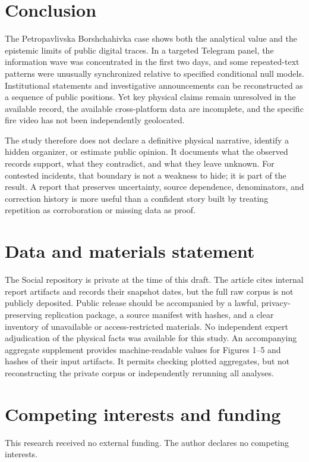 \section{Conclusion}

The Petropavlivska Borshchahivka case shows both the analytical value and the epistemic limits of public digital traces. In a targeted Telegram panel, the information wave was concentrated in the first two days, and some repeated-text patterns were unusually synchronized relative to specified conditional null models. Institutional statements and investigative announcements can be reconstructed as a sequence of public positions. Yet key physical claims remain unresolved in the available record, the available cross-platform data are incomplete, and the specific fire video has not been independently geolocated.

The study therefore does not declare a definitive physical narrative, identify a hidden organizer, or estimate public opinion. It documents what the observed records support, what they contradict, and what they leave unknown. For contested incidents, that boundary is not a weakness to hide; it is part of the result. A report that preserves uncertainty, source dependence, denominators, and correction history is more useful than a confident story built by treating repetition as corroboration or missing data as proof.

\section*{Data and materials statement}
The Social repository is private at the time of this draft. The article cites internal report artifacts and records their snapshot dates, but the full raw corpus is not publicly deposited. Public release should be accompanied by a lawful, privacy-preserving replication package, a source manifest with hashes, and a clear inventory of unavailable or access-restricted materials. No independent expert adjudication of the physical facts was available for this study. An accompanying aggregate supplement provides machine-readable values for Figures 1--5 and hashes of their input artifacts. It permits checking plotted aggregates, but not reconstructing the private corpus or independently rerunning all analyses.

\section*{Competing interests and funding}
This research received no external funding. The author declares no competing interests.

